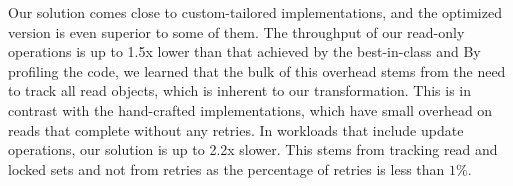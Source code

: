 
Our solution comes close to custom-tailored implementations, and the optimized version is even superior to some of them.
The throughput of our read-only operations is up to 1.5x lower than that achieved by the best-in-class and  
By profiling the code, we learned that the bulk of this overhead stems from the need to track all read objects,
which is inherent to our transformation.
This is in contrast with the hand-crafted implementations, which have small overhead on reads that complete without any retries. 
In workloads that include update operations, our solution is up to 2.2x slower. This stems from tracking read and locked sets and not from retries as the percentage of retries is less than $1\%$. 





